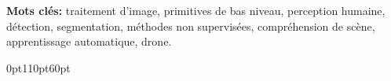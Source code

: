 %
  
\vspace*{\fill}

\textbf{Mots clés:} traitement d'image, primitives de bas niveau, perception humaine, détection, segmentation, méthodes non supervisées, compréhension de scène, apprentissage automatique, drone.

 {0pt}{110pt}{60pt}   %